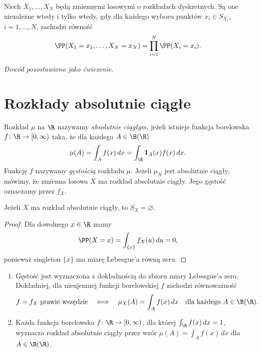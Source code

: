 
\begin{fakt}
\label{fakt:niezaleznosc-zmiennych-dyskretnych}
Niech $X_1,\ldots,X_N$ będą zmiennymi losowymi o rozkładach dyskretnych.
Są one niezależne wtedy i tylko wtedy, gdy dla każdego wyboru punktów
$x_i\in S_{X_i}$, $i=1,\ldots,N$, zachodzi równość
\[
  \PP(X_1=x_1,\ldots,X_N=x_N)=\prod_{i=1}^{N}\PP(X_i=x_i).
\]
\end{fakt}
\noindent\emph{Dowód pozostawiono jako ćwiczenie.}

\section{Rozkłady absolutnie ciągłe}
\label{sec:rozklady-absolutnie-ciagle}

\begin{definicja}
\label{def:rozklad-absolutnie-ciagly}
Rozkład $\mu$ na $\R$ nazywamy \emph{absolutnie ciągłym}, jeżeli istnieje
funkcja borelowska $f\colon\R\to[0,\infty)$ taka, że dla każdego
$A\in\B(\R)$
\[
  \mu(A)=\int_A f(x)\,dx
        =\int_{\R}\mathbf{1}_A(x)f(x)\,dx.
\]
Funkcję $f$ nazywamy \emph{gęstością} rozkładu $\mu$.
Jeżeli $\mu_X$ jest absolutnie ciągły, mówimy, że zmienna losowa $X$
ma rozkład absolutnie ciągły. Jego gęstość oznaczamy przez $f_X$.
\end{definicja}

\begin{fakt}
Jeżeli $X$ ma rozkład absolutnie ciągły, to $S_X=\varnothing$.
\end{fakt}

\begin{proof}
Dla dowolnego $x\in\R$ mamy
\[
  \PP(X=x)=\int_{\{x\}} f_X(u)\,du=0,
\]
ponieważ singleton $\{x\}$ ma miarę Lebesgue'a równą zeru.
\end{proof}

\begin{uwaga}
\label{uw:gestosc-a-rozklad}
\begin{enumerate}
  \item Gęstość jest wyznaczona z dokładnością do zbioru miary
    Lebesgue'a zero. Dokładniej, dla nieujemnej funkcji borelowskiej $f$
    zachodzi równoważność
    \[
      f=f_X\ \text{prawie wszędzie}
      \quad\Longleftrightarrow\quad
      \mu_X(A)=\int_A f(x)\,dx
      \quad\text{dla każdego }A\in\B(\R).
    \]
  \item Każda funkcja borelowska $f\colon\R\to[0,\infty)$, dla której
    $\int_{\R}f(x)\,dx=1$, wyznacza rozkład absolutnie ciągły przez
    wzór $\mu(A)=\int_A f(x)\,dx$ dla $A\in\B(\R)$.
\end{enumerate}
\end{uwaga}

